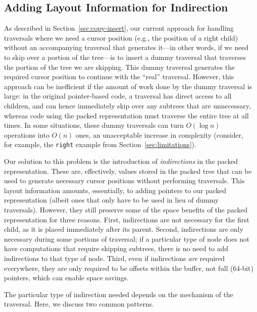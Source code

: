 \documentclass[a4paper,english]{lipics-v2016}
\begin{document}
\subsection{Adding Layout Information for Indirection}

As described in Section~\ref{sec:copy-insert}, our current approach for
handling traversals where we need a cursor position (e.g., the position of a
right child) without an accompanying traversal that generates it---in other
words, if we need to skip over a portion of the tree---is to insert a dummy traversal that traverses the portion of the tree we are skipping. This
dummy traversal generates the required cursor position to continue with the
``real'' traversal. However, this approach can be inefficient if the amount of work
done by the dummy traversal is large: in the original pointer-based code, a
traversal has direct access to all children, and can hence immediately skip
over any subtrees that are unnecessary, whereas code using the packed
representation must traverse the entire tree at all times. In some situations,
these dummy traversals can turn $O(\log n)$ operations into $O(n)$ ones,
an unacceptable increase in complexity (consider, for example, the {\tt right} example from Section~\ref{sec:limitations}).


Our solution to this problem is the introduction of {\em indirections} in the
packed representation. These are, effectively, values stored in the packed
tree that can be used to generate necessary cursor positions without
performing traversals. This layout information amounts, essentially, to adding
pointers to our packed representation (albeit ones that only have to be used
in lieu of dummy traversals). However, they still preserve some of the space
benefits of the packed representation for three reasons. First, indirections
are not necessary for the first child, as it is placed immediately after its
parent. Second, indirections are
only necessary during some portions of traversal; if a particular type of node
does not have computations that require skipping subtrees, there is no need to
add indirections to that type of node. Third, even if indirections {\em are}
required everywhere, they are only required to be offsets within the buffer,
not full (64-bit) pointers, which can enable space savings.

The particular type of indirection needed depends on the mechanism of the
traversal. Here,
we discuss two common patterns.
\end{document}
